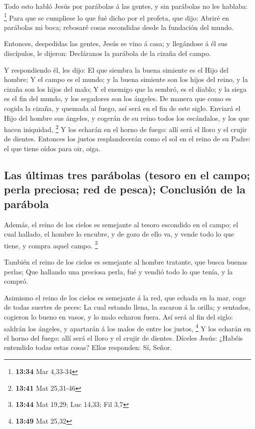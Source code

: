  Todo esto habló Jesús por parábolas á las gentes, y sin
parábolas no les hablaba: \footnote{\textbf{13:34} Mar 4,33-34}
 Para que se cumpliese lo que fué dicho por el profeta,
que dijo: Abriré en parábolas mi boca; rebosaré cosas escondidas desde
la fundación del mundo.

 Entonces, despedidas las gentes, Jesús se vino á casa; y
llegándose á él sus discípulos, le dijeron: Decláranos la parábola de la
cizaña del campo.

 Y respondiendo él, les dijo: El que siembra la buena
simiente es el Hijo del hombre;  Y el campo es el mundo;
y la buena simiente son los hijos del reino, y la cizaña son los hijos
del malo;  Y el enemigo que la sembró, es el diablo; y la
siega es el fin del mundo, y los segadores son los ángeles.
 De manera que como es cogida la cizaña, y quemada al
fuego, así será en el fin de este siglo.  Enviará el Hijo
del hombre sus ángeles, y cogerán de su reino todos los escándalos, y
los que hacen iniquidad, \footnote{\textbf{13:41} Mat 25,31-46}
 Y los echarán en el horno de fuego: allí será el lloro y
el crujir de dientes.  Entonces los justos resplandecerán
como el sol en el reino de su Padre: el que tiene oídos para oir, oiga.

\hypertarget{las-uxfaltimas-tres-paruxe1bolas-tesoro-en-el-campo-perla-preciosa-red-de-pesca-conclusiuxf3n-de-la-paruxe1bola}{%
\subsection{Las últimas tres parábolas (tesoro en el campo; perla
preciosa; red de pesca); Conclusión de la
parábola}\label{las-uxfaltimas-tres-paruxe1bolas-tesoro-en-el-campo-perla-preciosa-red-de-pesca-conclusiuxf3n-de-la-paruxe1bola}}

 Además, el reino de los cielos es semejante al tesoro
escondido en el campo; el cual hallado, el hombre lo encubre, y de gozo
de ello va, y vende todo lo que tiene, y compra aquel campo. \footnote{\textbf{13:44}
  Mat 19,29; Luc 14,33; Fil 3,7}

 También el reino de los cielos es semejante al hombre
tratante, que busca buenas perlas;  Que hallando una
preciosa perla, fué y vendió todo lo que tenía, y la compró.

 Asimismo el reino de los cielos es semejante á la red,
que echada en la mar, coge de todas suertes de peces:  La
cual estando llena, la sacaron á la orilla; y sentados, cogieron lo
bueno en vasos, y lo malo echaron fuera.  Así será al fin
del siglo: saldrán los ángeles, y apartarán á los malos de entre los
justos, \footnote{\textbf{13:49} Mat 25,32}  Y los
echarán en el horno del fuego: allí será el lloro y el crujir de
dientes.  Díceles Jesús: ¿Habéis entendido todas estas
cosas? Ellos responden: Sí, Señor.

